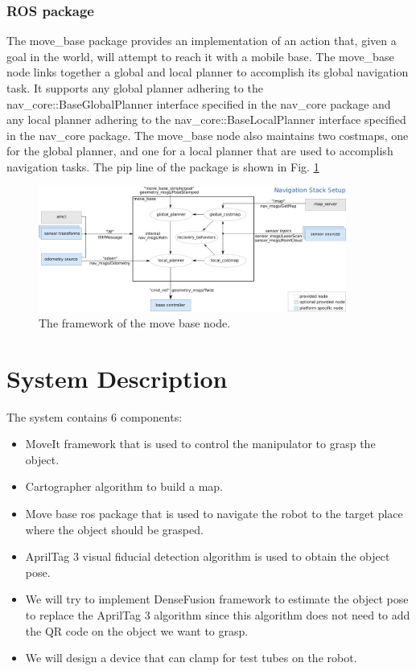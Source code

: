 \documentclass[12pt,draftclsnofoot,onecolumn]{IEEEtran}
\begin{document}
	\subsubsection{ROS package}
	The move\_base package provides an implementation of an action that,
	given a goal in the world, will attempt to reach it with a mobile base. The move\_base node links together a global and local planner to accomplish its global navigation task. 
	It supports any global planner adhering to the nav\_core::BaseGlobalPlanner interface specified in the nav\_core package 
	and any local planner adhering to the nav\_core::BaseLocalPlanner interface specified in the nav\_core package. 
	The move\_base node also maintains two costmaps, one for the global planner, 
	and one for a local planner that are used to accomplish navigation tasks.
	The pip line of the package is shown in Fig. \ref{movebase}
	\begin{figure}[H]
		\centering
		\includegraphics[width=0.9\textwidth]{img/movebase.png}
		\caption{
			The framework of the move base node.
		}
		\label{movebase}
	\end{figure}
	
	\section{System Description}
	The system contains 6 components:
	\begin{itemize}
		\item  MoveIt framework that is used to control the manipulator to grasp the object.
		\item Cartographer algorithm to build a map.
		\item Move base ros package that is used to navigate the robot to the target place where the object should be grasped.
		\item AprilTag 3 visual fiducial detection algorithm is used to obtain the object pose.
		\item We will try to implement DenseFusion framework to estimate the object pose to replace the AprilTag 3 algorithm 
		since this algorithm does not need to add the QR code on the object we want to grasp.
		\item We will design a device that can clamp for test tubes on the robot.
	\end{itemize}
	
\end{document}
